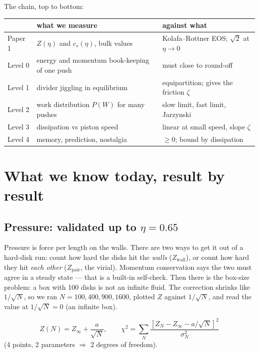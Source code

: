 \documentclass[11pt,a4paper]{article}
\begin{document}
The chain, top to bottom:
\begin{center}
\begin{tabular}{@{}lll@{}}
\toprule
& what we measure & against what\\
\midrule
Paper 1 & $Z(\eta)$ and $c_s(\eta)$, bulk values & Kolafa--Rottner EOS; $\sqrt2$ at $\eta\to0$\\
Level 0 & energy and momentum book-keeping of one push & must close to round-off\\
Level 1 & divider jiggling in equilibrium & equipartition; gives the friction $\zeta$\\
Level 2 & work distribution $P(W)$ for many pushes & slow limit, fast limit, Jarzynski\\
Level 3 & dissipation vs piston speed & linear at small speed, slope $\zeta$\\
Level 4 & memory, prediction, nostalgia & $\ge0$; bound by dissipation\\
\bottomrule
\end{tabular}
\end{center}

\section{What we know today, result by result}

\subsection{Pressure: validated up to $\eta = 0.65$}

\begin{eli}
Pressure is force per length on the walls. There are two ways to get it out of a hard-disk run: count how hard the disks hit the \emph{walls} ($Z_{\mathrm{wall}}$), or count how hard they hit \emph{each other} ($Z_{\mathrm{pair}}$, the virial). Momentum conservation says the two must agree in a steady state --- that is a built-in self-check. Then there is the box-size problem: a box with 100 disks is not an infinite fluid. The correction shrinks like $1/\sqrt N$, so we ran $N = 100, 400, 900, 1600$, plotted $Z$ against $1/\sqrt N$, and read the value at $1/\sqrt N = 0$ (an infinite box).
\end{eli}

\begin{equation}
Z(N) = Z_\infty + \frac{a}{\sqrt N},\qquad
\chi^2 = \sum_{N}\frac{\left[Z_N - Z_\infty - a/\sqrt N\right]^2}{\sigma_N^2}
\end{equation}
(4 points, 2 parameters $\Rightarrow$ 2 degrees of freedom).
\end{document}
